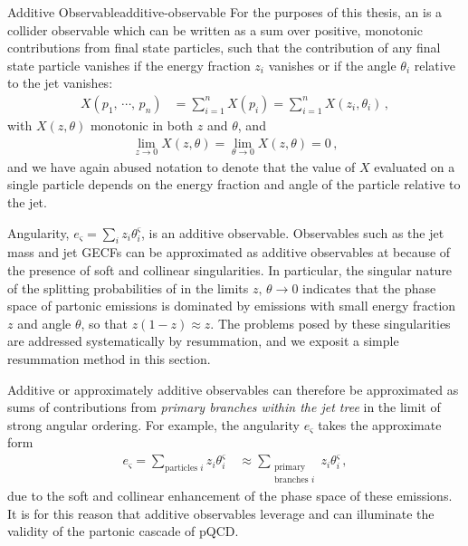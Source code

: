 \begin{definitionbox}{Additive Observable}{additive-observable}
    For the purposes of this thesis, an  is a collider observable which can be written as a sum over positive, monotonic contributions from final state particles, such that the contribution of any final state particle vanishes if the energy fraction \(z_i\) vanishes or if the angle \(\theta_i\) relative to the jet vanishes:
    \begin{align}
        X(p_1,\,\cdots,\,p_n)
        &=
        \sum_{i=1}^n X(p_i)
        =
        \sum_{i=1}^n X(z_i, \theta_i)
        \,,
    \end{align}
    with \(X(z, \theta)\) monotonic in both \(z\) and \(\theta\), and
    \begin{align}
        \lim_{z \to 0} X(z, \theta)
        =
        \lim_{\theta \to 0} X(z, \theta)
        =
        0
        \,,
    \end{align}
    and we have again abused notation to denote that the value of \(X\) evaluated on a single particle depends on the energy fraction and angle of the particle relative to the jet.
\end{definitionbox}

    Angularity, \(e_\varsigma = \sum_i z_i \theta_i^\varsigma\), is an additive observable.
    Observables such as the jet mass and jet GECFs can be approximated as additive observables at  because of the presence of soft and collinear singularities.
    In particular, the singular nature of the splitting probabilities of  in the limits \(z,\,\theta \to 0\) indicates that the phase space of partonic emissions is dominated by emissions with small energy fraction \(z\) and angle \(\theta\), so that \(z(1-z) \approx z\).%
    The problems posed by these singularities are addressed systematically by resummation, and we exposit a simple resummation method in this section.


Additive or approximately additive observables can therefore be approximated as sums of contributions from \emph{primary branches within the jet tree} in the limit of strong angular ordering.
%
For example, the angularity \(e_\varsigma\) takes the approximate form
\begin{align}
    e_\varsigma
    =
    \sum_{\text{particles } i}
        z_i \theta_i^\varsigma
    \quad
    \approx
    \sum_{\substack{\text{primary}\\\text{branches } i}}
        z_i \theta_i^\varsigma
    \,,
\end{align}
due to the soft and collinear enhancement of the phase space of these emissions.
%
It is for this reason that additive observables leverage and can illuminate the validity of the partonic cascade of pQCD.

